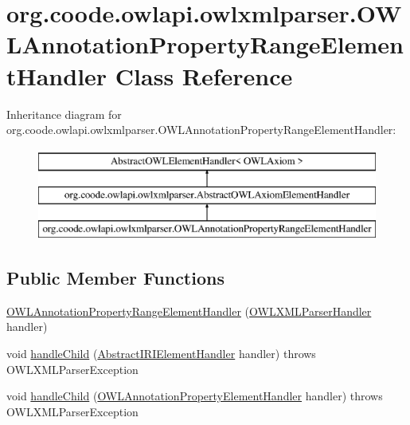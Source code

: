 \hypertarget{classorg_1_1coode_1_1owlapi_1_1owlxmlparser_1_1_o_w_l_annotation_property_range_element_handler}{\section{org.\-coode.\-owlapi.\-owlxmlparser.\-O\-W\-L\-Annotation\-Property\-Range\-Element\-Handler Class Reference}
\label{classorg_1_1coode_1_1owlapi_1_1owlxmlparser_1_1_o_w_l_annotation_property_range_element_handler}
}
Inheritance diagram for org.\-coode.\-owlapi.\-owlxmlparser.\-O\-W\-L\-Annotation\-Property\-Range\-Element\-Handler\-:\begin{figure}[H]
\begin{center}
\leavevmode
\includegraphics[height=3.000000cm]{classorg_1_1coode_1_1owlapi_1_1owlxmlparser_1_1_o_w_l_annotation_property_range_element_handler}
\end{center}
\end{figure}
\subsection*{Public Member Functions}
\begin{DoxyCompactItemize}
\item 
\hyperlink{classorg_1_1coode_1_1owlapi_1_1owlxmlparser_1_1_o_w_l_annotation_property_range_element_handler_a677c902a949b357b4f1b61e753f56955}{O\-W\-L\-Annotation\-Property\-Range\-Element\-Handler} (\hyperlink{classorg_1_1coode_1_1owlapi_1_1owlxmlparser_1_1_o_w_l_x_m_l_parser_handler}{O\-W\-L\-X\-M\-L\-Parser\-Handler} handler)
\item 
void \hyperlink{classorg_1_1coode_1_1owlapi_1_1owlxmlparser_1_1_o_w_l_annotation_property_range_element_handler_ad81ca17918935fca9843192dad21d2eb}{handle\-Child} (\hyperlink{classorg_1_1coode_1_1owlapi_1_1owlxmlparser_1_1_abstract_i_r_i_element_handler}{Abstract\-I\-R\-I\-Element\-Handler} handler)  throws O\-W\-L\-X\-M\-L\-Parser\-Exception 
\item 
void \hyperlink{classorg_1_1coode_1_1owlapi_1_1owlxmlparser_1_1_o_w_l_annotation_property_range_element_handler_a54abb4658465aaab47c032379430e763}{handle\-Child} (\hyperlink{classorg_1_1coode_1_1owlapi_1_1owlxmlparser_1_1_o_w_l_annotation_property_element_handler}{O\-W\-L\-Annotation\-Property\-Element\-Handler} handler)  throws O\-W\-L\-X\-M\-L\-Parser\-Exception 
\end{DoxyCompactItemize}

